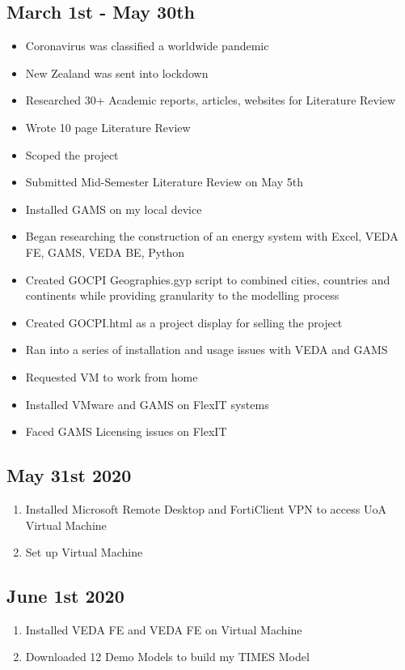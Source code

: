 \documentclass[12pt]{article}
\begin{document}
\subsection{March 1st - May 30th}
\begin{itemize}
	\item Coronavirus was classified a worldwide pandemic
	\item New Zealand was sent into lockdown
	\item Researched 30+ Academic reports, articles, websites for Literature Review
	\item Wrote 10 page Literature Review
	\item Scoped the project
	\item Submitted Mid-Semester Literature Review on May 5th
	\item Installed GAMS on my local device
	\item Began researching the construction of an energy system with Excel, VEDA FE, GAMS, VEDA BE, Python
	\item Created GOCPI Geographies.gyp script to combined cities, countries and continents while providing granularity to the modelling process
	\item Created GOCPI.html as a project display for selling the project
	\item Ran into a series of installation and usage issues with VEDA and GAMS
	\item Requested VM to work from home
	\item Installed VMware and GAMS on FlexIT systems
	\item Faced GAMS Licensing issues on FlexIT
\end{itemize}
\subsection{May 31st 2020}
\begin{enumerate}
	\item Installed Microsoft Remote Desktop and FortiClient VPN to access UoA Virtual Machine
	\item Set up Virtual Machine
\end{enumerate}
\subsection{June 1st 2020}
\begin{enumerate}
	\item Installed VEDA FE and VEDA FE on Virtual Machine
	\item Downloaded 12 Demo Models to build my TIMES Model
\end{enumerate}
\end{document}
